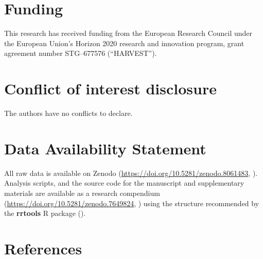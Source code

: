 \documentclass[
  11pt,
  leqno]{scrartcl}
\begin{document}
\section*{Funding}\label{funding}

This research has received funding from the European Research Council
under the European Union's Horizon 2020 research and innovation program,
grant agreement number STG--677576 (``HARVEST'').

\section*{Conflict of interest
disclosure}\label{conflict-of-interest-disclosure}

The authors have no conflicts to declare.

\section*{Data Availability
Statement}\label{data-availability-statement}

All raw data is available on Zenodo
(\url{https://doi.org/10.5281/zenodo.8061483},
).
Analysis scripts, and the source code for the manuscript and
supplementary materials are available as a research compendium
(\url{https://doi.org/10.5281/zenodo.7649824},
)
using the structure recommended by the \textbf{rrtools} R package
().

\section*{References}\label{references}
\end{document}
